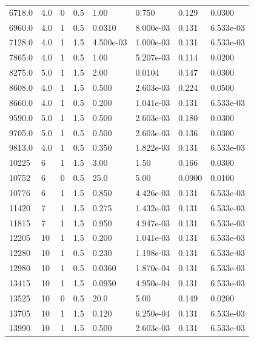 \documentclass[preview]{standalone}
\begin{document}
{{\begin{tabular}{L{1.2cm}C{1.2cm} C{0.3cm}C{0.5cm} C{1.4cm}C{1.4cm} C{1.4cm}C{1.4cm}}
  6718.0  &   4.0  & 0     & 0.5 &  1.00  & 0.750  & 0.129 &  0.0300   \\ 
  6960.0  &   4.0  & 1     & 0.5 &  0.0310  & 8.000e-03  & 0.131 &  6.533e-03   \\ 
  7128.0  &   4.0  & 1     & 1.5 &  4.500e-03  & 1.000e-03  & 0.131 &  6.533e-03   \\ 
  7865.0  &   4.0  & 1     & 0.5 &  1.00  & 5.207e-03  & 0.114 &  0.0200   \\ 
  8275.0  &   5.0  & 1     & 1.5 &  2.00  & 0.0104  & 0.147 &  0.0300   \\ 
  8608.0  &   4.0  & 1     & 1.5 &  0.500  & 2.603e-03  & 0.224 &  0.0500   \\ 
  8660.0  &   4.0  & 1     & 0.5 &  0.200  & 1.041e-03  & 0.131 &  6.533e-03   \\ 
  9590.0  &   5.0  & 1     & 1.5 &  0.500  & 2.603e-03  & 0.180 &  0.0300   \\ 
  9705.0  &   5.0  & 1     & 0.5 &  0.500  & 2.603e-03  & 0.136 &  0.0300   \\ 
  9813.0  &   4.0  & 1     & 0.5 &  0.350  & 1.822e-03  & 0.131 &  6.533e-03   \\ 
  10225  &     6  & 1     & 1.5 &  3.00  & 1.50  & 0.166 &  0.0300   \\ 
  10752  &     6  & 0     & 0.5 &  25.0  & 5.00  & 0.0900 &  0.0100   \\ 
  10776  &     6  & 1     & 1.5 &  0.850  & 4.426e-03  & 0.131 &  6.533e-03   \\ 
  11420  &     7  & 1     & 1.5 &  0.275  & 1.432e-03  & 0.131 &  6.533e-03   \\ 
  11815  &     7  & 1     & 1.5 &  0.950  & 4.947e-03  & 0.131 &  6.533e-03   \\ 
  12205  &    10  & 1     & 1.5 &  0.200  & 1.041e-03  & 0.131 &  6.533e-03   \\ 
  12280  &    10  & 1     & 0.5 &  0.230  & 1.198e-03  & 0.131 &  6.533e-03   \\ 
  12980  &    10  & 1     & 0.5 &  0.0360  & 1.870e-04  & 0.131 &  6.533e-03   \\ 
  13415  &    10  & 1     & 1.5 &  0.0950  & 4.950e-04  & 0.131 &  6.533e-03   \\ 
  13525  &    10  & 0     & 0.5 &  20.0  & 5.00  & 0.149 &  0.0200   \\ 
  13705  &    10  & 1     & 1.5 &  0.120  & 6.250e-04  & 0.131 &  6.533e-03   \\ 
  13990  &    10  & 1     & 1.5 &  0.500  & 2.603e-03  & 0.131 &  6.533e-03   \\ 

\end{tabular}}}
\end{document}
